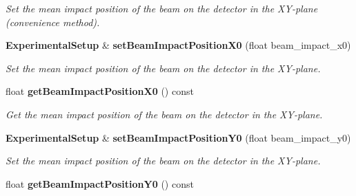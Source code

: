 \begin{DoxyCompactItemize}
\begin{DoxyCompactList}\small\item\em Set the mean impact position of the beam on the detector in the XY-\/plane (convenience method). \item\end{DoxyCompactList}\item 
{\bf ExperimentalSetup} \& {\bf setBeamImpactPositionX0} (float beam\_\-impact\_\-x0)\label{classCALICE_1_1ExperimentalSetup_a7384248835a18c483ff922426e372eab}

\begin{DoxyCompactList}\small\item\em Set the mean impact position of the beam on the detector in the XY-\/plane. \item\end{DoxyCompactList}\item 
float {\bf getBeamImpactPositionX0} () const \label{classCALICE_1_1ExperimentalSetup_a74f73b1fe7ccd42b48f3bc7834826a7b}

\begin{DoxyCompactList}\small\item\em Get the mean impact position of the beam on the detector in the XY-\/plane. \item\end{DoxyCompactList}\item 
{\bf ExperimentalSetup} \& {\bf setBeamImpactPositionY0} (float beam\_\-impact\_\-y0)\label{classCALICE_1_1ExperimentalSetup_a6e4037224f3d8372ddbc4d5a76a8b12a}

\begin{DoxyCompactList}\small\item\em Set the mean impact position of the beam on the detector in the XY-\/plane. \item\end{DoxyCompactList}\item 
float {\bf getBeamImpactPositionY0} () const \label{classCALICE_1_1ExperimentalSetup_adb19ccbf3411bf1824939323b71238c7}


\end{DoxyCompactItemize}
